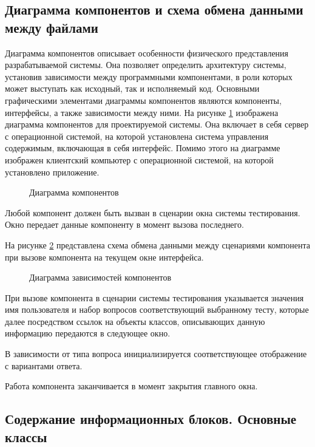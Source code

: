 \subsection{Диаграмма компонентов и схема обмена данными между файлами}

Диаграмма компонентов описывает особенности физического представления разрабатываемой системы. Она позволяет определить архитектуру системы, установив зависимости между программными компонентами, в роли которых может выступать как исходный, так и исполняемый код. Основными графическими элементами диаграммы компонентов являются компоненты, интерфейсы, а также зависимости между ними. На рисунке \ref{system_template:image} изображена диаграмма компонентов для проектируемой системы. Она включает в себя сервер с операционной системой, на которой установлена система управления содержимым, включающая в себя интерфейс. Помимо этого на диаграмме изображен клиентский компьютер с операционной системой, на которой установлено приложение.

\begin{figure}[ht]
\caption{Диаграмма компонентов}
\label{system_template:image}
\end{figure}

Любой компонент должен быть вызван в сценарии окна системы тестирования. Окно передает данные компоненту в момент вызова последнего.

На рисунке \ref{exchange_scheme:image} представлена схема обмена данными между сценариями компонента при вызове компонента на текущем окне интерфейса.

\begin{figure}[H]
\caption{Диаграмма зависимостей компонентов}
\label{exchange_scheme:image}
\end{figure}

При вызове компонента в сценарии системы тестирования указывается значения имя пользователя и набор вопросов соответствующий выбранному тесту, которые далее посредством ссылок на объекты классов, описывающих данную информацию передаются в следующее окно.

В зависимости от типа вопроса инициализируется соответствующее отображение с вариантами ответа.

Работа компонента заканчивается в момент закрытия главного окна.

\subsection{Содержание информационных блоков. Основные классы}

